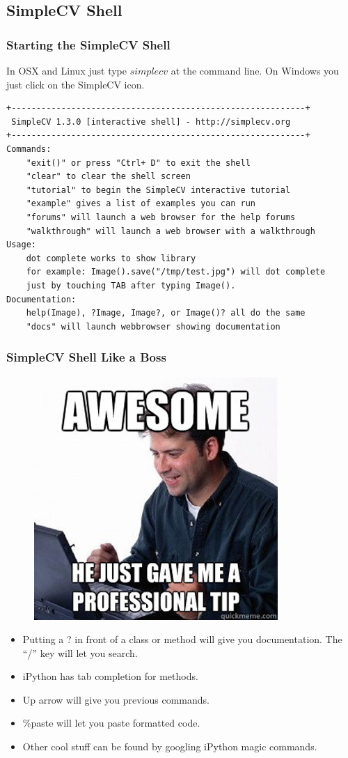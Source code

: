 \documentclass{beamer}
\begin{document}
\subsection{SimpleCV Shell}
\begin{frame}[fragile] %
\frametitle{Starting the SimpleCV Shell}
In OSX and Linux just type $simplecv$ at the command line. On Windows
you just click on the SimpleCV icon. 
\begin{example}
\begin{verbatim}
+-----------------------------------------------------------+
 SimpleCV 1.3.0 [interactive shell] - http://simplecv.org
+-----------------------------------------------------------+
Commands: 
	"exit()" or press "Ctrl+ D" to exit the shell
	"clear" to clear the shell screen
	"tutorial" to begin the SimpleCV interactive tutorial
	"example" gives a list of examples you can run
	"forums" will launch a web browser for the help forums
	"walkthrough" will launch a web browser with a walkthrough
Usage:
	dot complete works to show library
	for example: Image().save("/tmp/test.jpg") will dot complete
	just by touching TAB after typing Image().
Documentation:
	help(Image), ?Image, Image?, or Image()? all do the same
	"docs" will launch webbrowser showing documentation
\end{verbatim}
\end{example}
\end{frame}
\begin{frame}
\frametitle{SimpleCV Shell Like a Boss}
\begin{figure}
  \includegraphics[width=0.3\linewidth]{protip.jpg}
\end{figure}
\begin{itemize}
\item Putting a ? in front of a class or method will give you
  documentation. The ``/'' key will let you search.
\item iPython has tab completion for methods.
\item Up arrow will give you previous commands. 
\item \%paste will let you paste formatted code. 
\item Other cool stuff can be found by googling iPython magic commands.
\end{itemize}
\end{frame}
\end{document}
